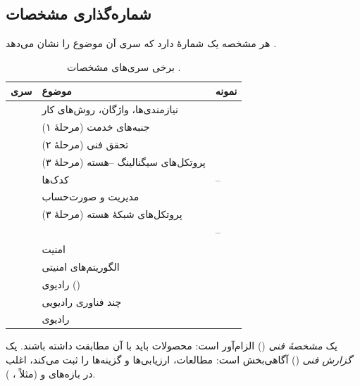 \documentclass[11pt,a4paper]{article}
\begin{document}
\subsection{شماره‌گذاری مشخصات}
هر مشخصه یک شمارهٔ  دارد که سری  آن موضوع را نشان می‌دهد \cite{tr21900}.
\begin{table}[htbp]
\centering\small
\caption{برخی سری‌های مشخصات .}\label{tab:series}
\begin{tabularx}{\linewidth}{@{}l Y l@{}}
\toprule
{}سری & موضوع & نمونه \\
\midrule
{} & نیازمندی‌ها، واژگان، روش‌های کار          &  \cite{tr21905} \\
 & جنبه‌های خدمت (مرحلهٔ ۱)                   &  \\
 & تحقق فنی (مرحلهٔ ۲)                        &  \\
 & پروتکل‌های سیگنالینگ --هسته (مرحلهٔ ۳) &  \\
 & کدک‌ها                                     & -- \\
 & مدیریت و صورت‌حساب                     &  \\
 & پروتکل‌های شبکهٔ هسته (مرحلهٔ ۳)            &  \\
 &                               & -- \\
 & امنیت                                      &  \\
 & الگوریتم‌های امنیتی                        &  \\
 & رادیوی  ()             &  \\
 & چند فناوری رادیویی                         &  \\
 & رادیوی                             &  \\
\bottomrule
\end{tabularx}
\end{table}
یک \emph{مشخصهٔ فنی} () الزام‌آور است: محصولات باید با آن مطابقت داشته باشند. یک \emph{گزارش فنی} ()
آگاهی‌بخش است: مطالعات، ارزیابی‌ها و گزینه‌ها را ثبت می‌کند، اغلب در بازه‌های  و  (مثلاً 
\cite{tr38913}،  \cite{tr38901}).

\end{document}
